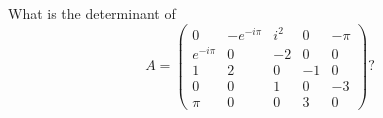 What is the determinant of
	$$
	A = \begin{pmatrix}
	0				&-e^{-i\pi}	&i^2	&0		&-\pi\\
	e^{-i\pi}		&0			&-2		&0		&0\\
	1				&2			&0		&-1		&0\\
	0				&0			&1		&0		&-3\\
	\pi				&0			&0		&3		&0
	\end{pmatrix}?
	$$

 